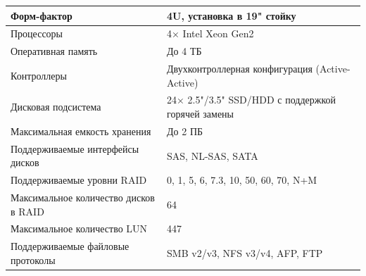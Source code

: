 \documentclass[14pt, a4paper]{extarticle}
\begin{document}
\begin{tabularx}{\textwidth}{|l|X|}
  Форм-фактор                                     & 4U, установка в 19" стойку                                                                                                                                \\\hline
  Процессоры                                      & 4× Intel Xeon Gen2                                                                                                                                   \\\hline
  Оперативная память                              & До 4 ТБ                                                                                                                                                   \\\hline
  Контроллеры                                     & Двухконтроллерная конфигурация (Active-Active)                                                                                                            \\\hline
  Дисковая подсистема                             & 24× 2.5"/3.5" SSD/HDD с поддержкой горячей замены                                                                                                         \\\hline
  Максимальная емкость хранения                   & До 2 ПБ                                                                                                                                                   \\\hline
  Поддерживаемые интерфейсы дисков                & SAS, NL-SAS, SATA                                                                                                                                         \\\hline
  Поддерживаемые уровни RAID                      & 0, 1, 5, 6, 7.3, 10, 50, 60, 70, N+M                                                                                                                      \\\hline
  Максимальное количество дисков в RAID           & 64                                                                                                                                                        \\\hline
  Максимальное количество LUN                     & 447                                                                                                                                                       \\\hline
  Поддерживаемые файловые протоколы               & SMB v2/v3, NFS v3/v4, AFP, FTP                                                                                                                            \\\hline

\end{tabularx}
\end{document}
